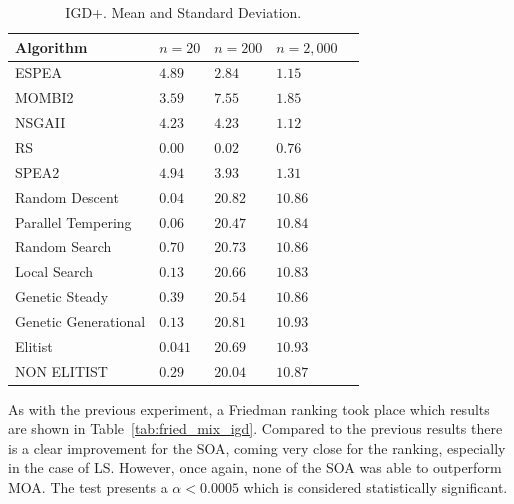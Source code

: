 \begin{table}[H]
    \centering
    {%
    \begin{tabular}{lllll}
    \hline
    Algorithm & $n=20$ & $n=200$ & $n=2,000$ \\
    \hline
    ESPEA                & $  4.89$                    & \cellcolor{gray25}$  2.84$ & $  1.15$                  \\
    MOMBI2               & $  3.59$                    & $ 7.55$  & $  1.85$                 \\
    NSGAII               & $  4.23$                    & $  4.23$                    & \cellcolor{gray25}$  1.12$   \\
    RS                   & \cellcolor{gray95}$ 0.00$   & \cellcolor{gray95}$  0.02$   & \cellcolor{gray95}$  0.76$  \\
    SPEA2                & $  4.94$                    & $   3.93$                    & $   1.31$                   \\
    Random Descent       & $  0.04$                    & $  20.82$                    & $  10.86$                   \\
    Parallel Tempering   & $  0.06$                    & $  20.47$                    & $  10.84$                   \\
    Random Search        & $  0.70$                    & $  20.73$                    & $  10.86$                   \\
    Local Search         & $  0.13$                    & $  20.66$                    & $  10.83$                   \\
    Genetic Steady       & $  0.39$                    & $  20.54$                    & $  10.86$                   \\
    Genetic Generational & $  0.13$                    & $  20.81$                    & $  10.93$                   \\
    Elitist              & \cellcolor{gray25}$  0.041$ & $  20.69$                    & $  10.93$                   \\
    NON ELITIST          & $  0.29$                    & $  20.04$                    & $  10.87$                   \\
    \hline
    \end{tabular}%
    }
    \caption{IGD+. Mean and Standard Deviation.}
    \label{tab:me_std_mix_igdp}
\end{table}

As with the previous experiment, a Friedman ranking took place which results are shown in Table~\ref{tab:fried_mix_igd}. Compared to the previous results there is a clear improvement for the SOA, coming very close for the ranking, especially in the case of LS. However, once again, none of the SOA was able to outperform MOA. The test presents a $\alpha < 0.0005$ which is considered statistically significant.

